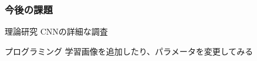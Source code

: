\documentclass[dvipdfmx,11pt,notheorems]{beamer}
\theoremstyle{definition}
\begin{document}






\begin{frame}\frametitle{今後の課題}

\begin{block}{理論研究}
CNNの詳細な調査
\end{block}

\vspace{1cm}
\begin{exampleblock}{プログラミング}
学習画像を追加したり、パラメータを変更してみる
\end{exampleblock}
\end{frame}
\end{document}
